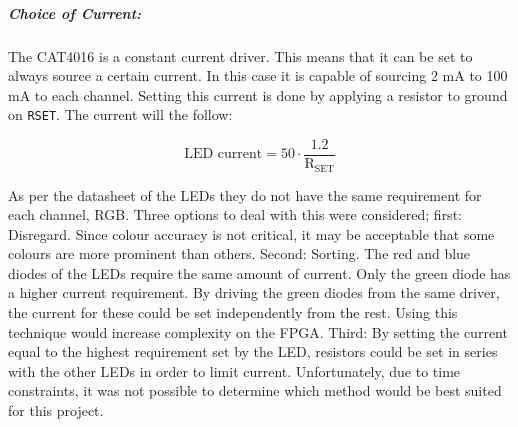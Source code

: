 \subparagraph{Choice of Current:}
The CAT4016 is a constant current driver.
This means that it can be set to always source a certain current.
In this case it is capable of sourcing 2 mA to 100 mA to each channel.
Setting this current is done by applying a resistor to ground on \texttt{RSET}.
The current will the follow:

$$\text{LED current} = 50 \cdot \frac{1.2}{\text{R}_\text{SET}}$$

As per the datasheet of the LEDs they do not have the same requirement for each channel, RGB.
Three options to deal with this were considered; 
first: Disregard. Since colour accuracy is not critical, it may be acceptable that some colours are more prominent than others.
Second: Sorting. The red and blue diodes of the LEDs require the same amount of current.
Only the green diode has a higher current requirement.
By driving the green diodes from the same driver, the current for these could be set independently from the rest.
Using this technique would increase complexity on the FPGA.
Third: By setting the current equal to the highest requirement set by the LED, resistors could be set in series with the other LEDs in order to limit current.
Unfortunately, due to time constraints, it was not possible to determine which method would be best suited for this project.

